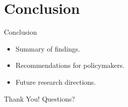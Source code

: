 \documentclass{beamer}
\begin{document}
\section{Conclusion}
\begin{frame}{Conclusion}
    \begin{itemize}
        \item Summary of findings.
        \item Recommendations for policymakers.
        \item Future research directions.
    \end{itemize}
\end{frame}

\begin{frame}{Thank You!}
    \centering
    Questions?
\end{frame}
\end{document}
